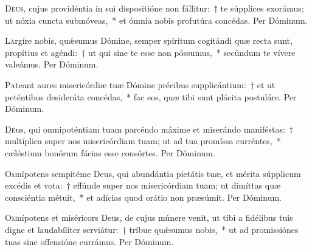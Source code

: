\documentclass[vesperale_romanum.tex]{subfiles}
\begin{document}
\oratio

\lettrine{D}{eus}, cujus providéntia in sui dispositióne non fállitur:~† te súpplices exorámus; ut nóxia cuncta submóveas,~* et ómnia nobis profutúra concédas.
Per Dóminum. 



\oratio

\lettrine{L}{a}rgíre nobis, quǽsumus Dómine, semper spíritum cogitándi quæ recta sunt, propítius et agéndi:~† ut qui sine te esse non póssumus,~* secúndum te vívere valeámus. Per Dóminum. 




\oratio

\lettrine{P}{a}teant aures misericórdiæ tuæ Dómine précibus supplicántium:~† et ut peténtibus desideráta concédas,~* fac eos, quæ tibi sunt plácita postuláre.
Per Dóminum.



\oratio

\lettrine{D}{e}us, qui omnipoténtiam tuam parcéndo máxime et miserándo maniféstas:~† multíplica super nos misericórdiam tuam; ut ad tua promíssa curréntes,~* cæléstium bonórum fácias esse consórtes. Per Dóminum.



\oratio

\lettrine{O}{m}nípotens sempitéme Deus, qui abundántia pietátis tuæ, et mérita súpplicum excédis et vota:~† effúnde super nos misericórdiam tuam; ut dimíttas quæ consciéntia métuit,~* et adícias quod orátio non præsúmit. Per Dóminum.



\oratio

\lettrine{O}{m}nípotens et miséricors Deus, de cujus múnere venit, ut tibi a fidélibus tuis digne et laudabíliter serviátur:~† tríbue quǽsumus nobis,~* ut ad promissiónes tuas sine offensióne currámus. Per Dóminum.
\end{document}
